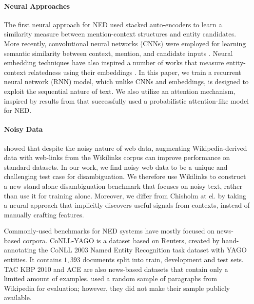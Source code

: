 \documentclass[11pt,a4paper]{article}
\begin{document}
	\paragraph{Neural Approaches}
	
	The first neural approach for NED \cite{he2013learning} used stacked auto-encoders to learn a similarity measure between mention-context structures and entity candidates. More recently, convolutional neural networks (CNNs) were employed for learning semantic similarity between context, mention, and candidate inputs \cite{sun2015modeling,francis2016capturing}. Neural embedding techniques have also inspired a number of works that measure entity-context relatedness using their embeddings \cite{yamada2016joint,Hu2015Entity}. In this paper, we train a recurrent neural network (RNN) model, which unlike CNNs and embeddings, is designed to exploit the sequential nature of text. We also utilize an attention mechanism, inspired by results from  that successfully used a probabilistic attention-like model for NED.
	
	\paragraph{Noisy Data}
	
	 showed that despite the noisy nature of web data, augmenting Wikipedia-derived data with web-links from the Wikilinks corpus \cite{singh12:wiki-links} can improve performance on standard datasets. 
	In our work, we find noisy web data to be a unique and challenging test case for disambiguation. We therefore use Wikilinks to construct a new stand-alone disambiguation benchmark that focuses on noisy text, rather than use it for training alone. 
	Moreover, we differ from Chisholm at el. by taking a neural approach that implicitly discovers useful signals from contexts, instead of manually crafting features.
	
	Commonly-used benchmarks for NED systems have mostly focused on news-based corpora. CoNLL-YAGO \cite{hoffart2011robust} is a dataset based on Reuters, created by hand-annotating the CoNLL 2003 Named Entity Recognition task dataset with YAGO \cite{suchanek2007} entities. It contains $1,393$ documents split into train, development and test sets. TAC KBP 2010 \cite{ji2010overview} and ACE  are also news-based datasets that contain only a limited amount of examples.  used a random sample of paragraphs from Wikipedia for evaluation; however, they did not make their sample publicly available.
	
\end{document}
